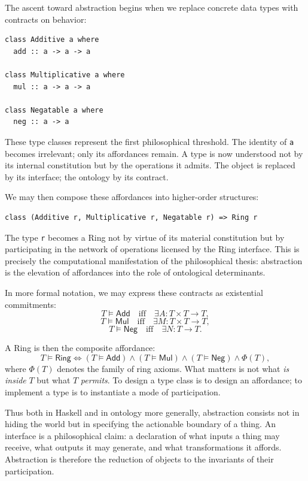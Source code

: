 \documentclass[12pt,letterpaper]{article}
\begin{document}
The ascent toward abstraction begins when we replace concrete data types with contracts on behavior:
\begin{verbatim}
class Additive a where
  add :: a -> a -> a

class Multiplicative a where
  mul :: a -> a -> a

class Negatable a where
  neg :: a -> a
\end{verbatim}

These type classes represent the first philosophical threshold. The identity of \texttt{a} becomes irrelevant; only its affordances remain. A type is now understood not by its internal constitution but by the operations it admits. The object is replaced by its interface; the ontology by its contract.

We may then compose these affordances into higher-order structures:
\begin{verbatim}
class (Additive r, Multiplicative r, Negatable r) => Ring r
\end{verbatim}

The type \texttt{r} becomes a Ring not by virtue of its material constitution but by participating in the network of operations licensed by the Ring interface. This is precisely the computational manifestation of the philosophical thesis: abstraction is the elevation of affordances into the role of ontological determinants.

In more formal notation, we may express these contracts as existential commitments:
\[
T \vDash \mathsf{Add} \quad \text{iff} \quad \exists A: T \times T \to T,
\]
\[
T \vDash \mathsf{Mul} \quad \text{iff} \quad \exists M: T \times T \to T,
\]
\[
T \vDash \mathsf{Neg} \quad \text{iff} \quad \exists N: T \to T.
\]

A Ring is then the composite affordance:
\[
T \vDash \mathsf{Ring} \iff 
   (T \vDash \mathsf{Add}) 
\land (T \vDash \mathsf{Mul}) 
\land (T \vDash \mathsf{Neg})
\land \Phi(T),
\]
where \(\Phi(T)\) denotes the family of ring axioms. What matters is not what \emph{is inside} \(T\) but what \(T\) \emph{permits}. To design a type class is to design an affordance; to implement a type is to instantiate a mode of participation.

Thus both in Haskell and in ontology more generally, abstraction consists not in hiding the world but in specifying the actionable boundary of a thing. An interface is a philosophical claim: a declaration of what inputs a thing may receive, what outputs it may generate, and what transformations it affords. Abstraction is therefore the reduction of objects to the invariants of their participation.
\end{document}
